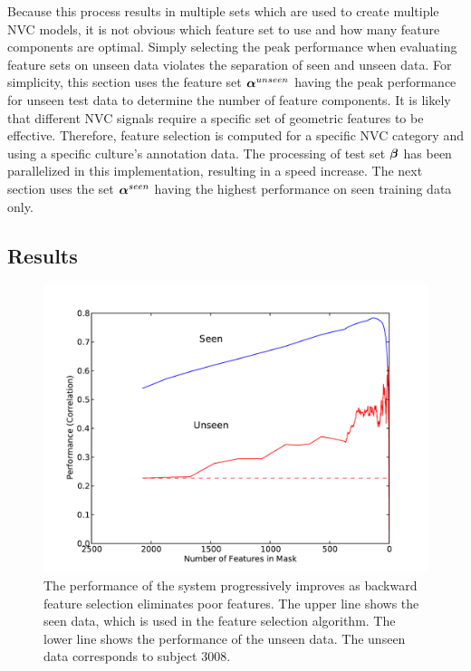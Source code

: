 Because this process results in multiple sets which are used to create multiple \ac{NVC} models, it is not obvious which feature set to use and how many feature components are optimal. Simply selecting the peak performance when evaluating feature sets on unseen data violates the separation of seen and unseen data. For simplicity, this section uses the feature set $\boldsymbol\alpha^{unseen}$ having the peak performance for unseen test data to determine the number of feature components. It is likely that different \ac{NVC} signals require a specific set of geometric features to be effective. Therefore, feature selection is computed for a specific \ac{NVC} category and using a specific culture's annotation data. The processing of test set $\boldsymbol\beta$ has been parallelized in this implementation, resulting in a speed increase. The next section uses the set $\boldsymbol\alpha^{seen}$ having the highest performance on seen training data only.

\subsection{Results}
\label{SectionFeatureSelectionUnseenPeak}

\begin{figure}[tb]
\centering
\includegraphics[width = 0.7 \columnwidth]{featureselection/shuffle-gbr-think/shufflefs-reverse-GBR-thinking-3008.pdf}
\caption[The performance of the system progressively improves as backward feature selection eliminates poor features.]{The performance of the system progressively improves as backward feature selection eliminates poor features. The upper line shows the seen data, which is used in the feature selection algorithm. The lower line shows the performance of the unseen data. The unseen data corresponds to subject 3008.}
\label{FigureShuffleGbrThink}
\end{figure}

